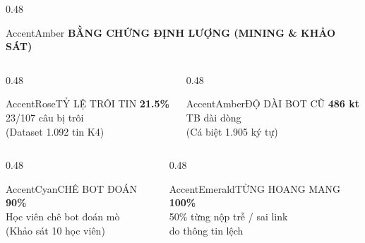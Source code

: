\documentclass[aspectratio=169,10pt]{beamer}
\begin{document}
\begin{frame}
\begin{columns}[T]
    \begin{column}{0.48\textwidth}
      \begin{glassbox}{AccentAmber}
        \centering
        {\small \textbf{\color{AccentAmber} BẰNG CHỨNG ĐỊNH LƯỢNG (MINING \& KHẢO SÁT)}}\\[0.2cm]
        \begin{columns}[T]
          \begin{column}{0.48\textwidth}
            \begin{metricbox}{AccentRose}{TỶ LỆ TRÔI TIN}
              {\large \textbf{\color{AccentRose} 21.5\%}}\\[0.05cm]
              {\tiny \color{TextMuted} 23/107 câu bị trôi\\(Dataset 1.092 tin K4)}
            \end{metricbox}
          \end{column}
          \begin{column}{0.48\textwidth}
            \begin{metricbox}{AccentAmber}{ĐỘ DÀI BOT CŨ}
              {\large \textbf{\color{AccentAmber} 486 kt}}\\[0.05cm]
              {\tiny \color{TextMuted} TB dài dòng\\(Cá biệt 1.905 ký tự)}
            \end{metricbox}
          \end{column}
        \end{columns}
        \vspace{0.15cm}
        \begin{columns}[T]
          \begin{column}{0.48\textwidth}
            \begin{metricbox}{AccentCyan}{CHÊ BOT ĐOÁN}
              {\large \textbf{\color{AccentCyan} 90\%}}\\[0.05cm]
              {\tiny \color{TextMuted} Học viên chê bot đoán mò\\(Khảo sát 10 học viên)}
            \end{metricbox}
          \end{column}
          \begin{column}{0.48\textwidth}
            \begin{metricbox}{AccentEmerald}{TỪNG HOANG MANG}
              {\large \textbf{\color{AccentEmerald} 100\%}}\\[0.05cm]
              {\tiny \color{TextMuted} 50\% từng nộp trễ / sai link\\do thông tin lệch}
            \end{metricbox}
          \end{column}
        \end{columns}
      \end{glassbox}
    \end{column}
  \end{columns}
\end{frame}
\end{document}
